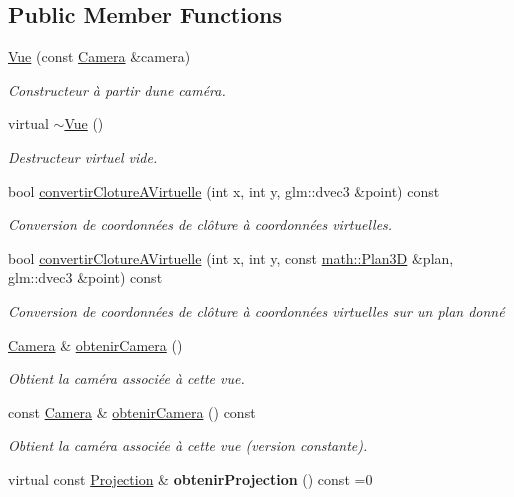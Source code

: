 \subsection*{Public Member Functions}
\begin{DoxyCompactItemize}
\item 
\hyperlink{classvue_1_1_vue_a61e0650d91fee934f162f324d6b39efe}{Vue} (const \hyperlink{classvue_1_1_camera}{Camera} \&camera)
\begin{DoxyCompactList}\small\item\em Constructeur à partir d\textquotesingle{}une caméra. \end{DoxyCompactList}\item 
\hypertarget{classvue_1_1_vue_a60df66ac1ee34a4d48fbbbda05c041b2}{}virtual \hyperlink{classvue_1_1_vue_a60df66ac1ee34a4d48fbbbda05c041b2}{$\sim$\+Vue} ()\label{classvue_1_1_vue_a60df66ac1ee34a4d48fbbbda05c041b2}

\begin{DoxyCompactList}\small\item\em Destructeur virtuel vide. \end{DoxyCompactList}\item 
bool \hyperlink{classvue_1_1_vue_a16f3478805bc7e0e9b42caeb0c418fa5}{convertir\+Cloture\+A\+Virtuelle} (int x, int y, glm\+::dvec3 \&point) const 
\begin{DoxyCompactList}\small\item\em Conversion de coordonnées de clôture à coordonnées virtuelles. \end{DoxyCompactList}\item 
bool \hyperlink{classvue_1_1_vue_a7f25d1c50b1ac550f8faa510e560311d}{convertir\+Cloture\+A\+Virtuelle} (int x, int y, const \hyperlink{classmath_1_1_plan3_d}{math\+::\+Plan3\+D} \&plan, glm\+::dvec3 \&point) const 
\begin{DoxyCompactList}\small\item\em Conversion de coordonnées de clôture à coordonnées virtuelles sur un plan donné \end{DoxyCompactList}\item 
\hyperlink{classvue_1_1_camera}{Camera} \& \hyperlink{classvue_1_1_vue_a6c4dd99b71433d228918cbbdb65b2895}{obtenir\+Camera} ()
\begin{DoxyCompactList}\small\item\em Obtient la caméra associée à cette vue. \end{DoxyCompactList}\item 
const \hyperlink{classvue_1_1_camera}{Camera} \& \hyperlink{classvue_1_1_vue_af13f29f708c59fada3794e1e0a20c5b3}{obtenir\+Camera} () const 
\begin{DoxyCompactList}\small\item\em Obtient la caméra associée à cette vue (version constante). \end{DoxyCompactList}\item 
\hypertarget{classvue_1_1_vue_a92f725ddaf3e483fed521b5b0977a6e1}{}virtual const \hyperlink{classvue_1_1_projection}{Projection} \& {\bfseries obtenir\+Projection} () const  =0\label{classvue_1_1_vue_a92f725ddaf3e483fed521b5b0977a6e1}


\end{DoxyCompactItemize}
